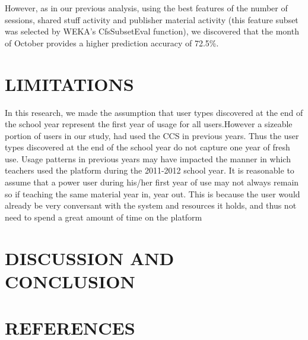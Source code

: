 \documentclass{acm_proc_article-sp}
\begin{document}
However, as in our previous analysis, using the best features of the number of sessions, shared stuff activity and publisher material activity (this feature subset was selected by WEKA's CfsSubsetEval function), we discovered that the month of October provides a higher prediction accuracy of 72.5\%.

\section{LIMITATIONS}
In this research, we made the assumption that user types discovered at the end of the school year represent the first year of usage for all users.However a sizeable portion of users in our study, had used the CCS in previous years. Thus the user types discovered at the end of the school year do not capture one year of fresh use. Usage patterns in previous years may have impacted the manner in which teachers used the platform during the 2011-2012 school year. It is reasonable to assume that a power user during his/her first year of use may not always remain so if teaching the same material year in, year out. This is because the user would already be very conversant with the system and resources it holds, and thus not need to spend a great amount of time on the platform
\section{DISCUSSION AND CONCLUSION}

\section{REFERENCES}

  
\end{document}
